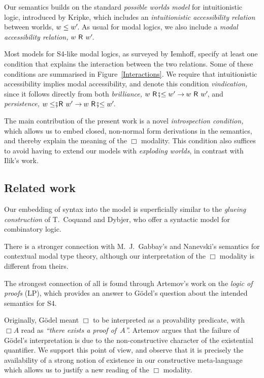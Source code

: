 \documentclass[submission,copyright,creativecommons,sharealike,backref=page]{eptcs}
\newcommand{\R}{\mathrel{\rlap{$\mkern.75mu\textsf{R}$}\hphantom{\subseteq}}}
\renewcommand{\:}{\mathop{\mkern3mu:\mkern3mu}}
\renewcommand{\.}{\mathop{\mkern3mu.\mkern3mu}}
\renewcommand{\;}{\mathop{;}}
\renewcommand{\,}{\mathop{,}}
\renewcommand{\r}{\mathrel{\rightarrow\mkern-1mu}}
\newcommand{\s}{\fatsemi}
\newcommand{\Rsle}{\mathrel{\R\mkern-4mu\s\mkern-4mu\le}}
\newcommand{\lesR}{\mathrel{\le\mkern-4mu\s\mkern-4mu\R}}
\theoremstyle{mystyle}
\begin{document}
Our semantics builds on the standard \emph{possible worlds model} for intuitionistic logic, introduced by Kripke\cite{Kripke65}, which includes an \emph{intuitionistic accessibility relation} between worlds, $w \le w'\mkern-3mu$.  As usual for modal logics, we also include a \emph{modal accessibility relation,} $w \R w'\mkern-3mu$.

Most models for S4-like modal logics, as surveyed by Iemhoff\cite{Iemhoff01}, specify at least one condition that explains the interaction between the two relations.  Some of these conditions are summarised in Figure~\ref{Interactions}.  We require that intuitionistic accessibility implies modal accessibility, and denote this condition \emph{vindication,} since it follows directly from both \emph{brilliance,} $w \Rsle w' \r w \R w'\mkern-3mu$, and \emph{persistence,} $w \lesR w' \r w \Rsle w'\mkern-3mu$.

The main contribution of the present work is a novel \emph{introspection condition,} which allows us to embed closed, non-normal form derivations in the semantics, and thereby explain the meaning of the $\Box$ modality.  This condition also suffices to avoid having to extend our models with \emph{exploding worlds}, in contrast with Ilik's work.


\subsection*{Related work}

Our embedding of syntax into the model is superficially similar to the \emph{glueing construction} of T.~Coquand and Dybjer\cite{CoquandD97}, who offer a syntactic model for combinatory logic.

There is a stronger connection with M.~J.~Gabbay's and Nanevski's\cite{GabbayN13} semantics for contextual modal type theory, although our interpretation of the $\Box$ modality is different from theirs.

The strongest connection of all is found through Artemov's\cite{Artemov01} work on the \emph{logic of proofs} (LP), which provides an answer to G{\"o}del's\cite{Godel33} question about the intended semantics for S4.

Originally, G{\"o}del meant $\Box$ to be interpreted as a provability predicate, with $\Box A$ read as \textsl{``there exists a proof of~$A$''.}  Artemov argues that the failure of G{\"o}del's interpretation is due to the non-constructive character of the existential quantifier.  We support this point of view, and observe that it is precisely the availability of a strong notion of existence in our constructive meta-language which allows us to justify a new reading of the $\Box$ modality.
\end{document}
